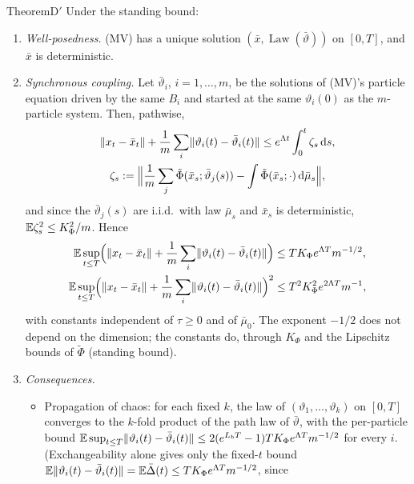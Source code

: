 \begin{thm}{Theorem}{D$'$}
Under the standing bound:
\begin{enumerate}[label=\textup{(\alph*)}]
  \item \emph{Well-posedness.} \textup{(MV)} has a unique solution $(\bar x,\operatorname{Law}(\bar\vartheta))$ on
    $[0,T]$, and $\bar x$ is deterministic.
  \item \emph{Synchronous coupling.} Let $\bar\vartheta_i$, $i = 1,\dots,m$, be the solutions of \textup{(MV)}'s
    particle equation driven by the same $B_i$ and started at the same $\vartheta_i(0)$ as the $m$-particle system.
    Then, pathwise,
    \begin{gather*}
      \lVert x_t - \bar x_t\rVert + \frac1m\sum_i\lVert \vartheta_i(t) - \bar\vartheta_i(t)\rVert \le e^{\Lambda t}\int_0^t\zeta_s\,\mathrm{d} s,\\
      \zeta_s := \Bigl\lVert\frac1m\sum_j\tilde\Phi(\bar x_s;\bar\vartheta_j(s))
      - \int\tilde\Phi(\bar x_s;\cdot)\,\mathrm{d}\bar\mu_s\Bigr\rVert,
    \end{gather*}
    and since the $\bar\vartheta_j(s)$ are i.i.d.\ with law $\bar\mu_s$ and $\bar x_s$ is deterministic,
    $\mathbb{E}\zeta_s^2 \le K_\Phi^2/m$. Hence
    \begin{align*}
      \mathbb{E}\sup_{t\le T}\Bigl(\lVert x_t - \bar x_t\rVert + \frac1m\sum_i\lVert \vartheta_i(t) - \bar\vartheta_i(t)\rVert\Bigr)
      &\le TK_\Phi e^{\Lambda T}m^{-1/2},\\
      \mathbb{E}\sup_{t\le T}\Bigl(\lVert x_t - \bar x_t\rVert + \frac1m\sum_i\lVert \vartheta_i(t) - \bar\vartheta_i(t)\rVert\Bigr)^2
      &\le T^2K_\Phi^2e^{2\Lambda T}m^{-1},
    \end{align*}
    with constants independent of $\tau\ge0$ and of $\bar\mu_0$. The exponent $-1/2$ does not depend on the
    dimension; the constants do, through $K_\Phi$ and the Lipschitz bounds of $\tilde\Phi$ \textup{(}standing
    bound\textup{)}.
  \item \emph{Consequences.}
    \begin{itemize}
      \item Propagation of chaos: for each fixed $k$, the law of $(\vartheta_1,\dots,\vartheta_k)$ on $[0,T]$
        converges to the $k$-fold product of the path law of $\bar\vartheta$, with the per-particle bound
        $\mathbb{E}\sup_{t\le T}\lVert \vartheta_i(t) - \bar\vartheta_i(t)\rVert \le 2(e^{L_bT} - 1)TK_\Phi e^{\Lambda T}m^{-1/2}$
        for every $i$. \textup{(}Exchangeability alone gives only the fixed-$t$ bound
        $\mathbb{E}\lVert \vartheta_i(t) - \bar\vartheta_i(t)\rVert = \mathbb{E}\bar\Delta(t) \le TK_\Phi e^{\Lambda T}m^{-1/2}$, since

\end{itemize}
\end{enumerate}
\end{thm}
